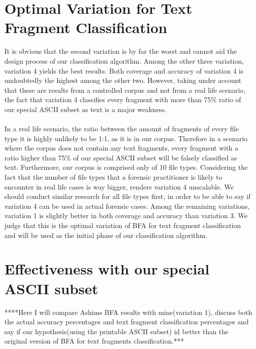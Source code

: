 \section{Optimal Variation for Text Fragment Classification}
It is obvious that the second variation is by far the worst and cannot aid the design process of our classification algorithm. Among the other three variation, variation 4 yields the best results. Both coverage and accuracy of variation 4 is undoubtedly the highest among the other two. However, taking under account that these are results from a controlled corpus and not from a real life scenario, the fact that variation 4 classifies every fragment with more than 75\% ratio of our special ASCII subset as text is a major weakness.\\\\
 In a real life scenario, the ratio between the amount of fragments of every file type it is highly unlikely to be 1:1, as it is in our corpus. Therefore in a scenario where the corpus does not contain any text fragments, every fragment with a ratio higher than 75\% of our special ASCII subset will be falsely classified as text. Furthermore, our corpus is comprised only of 10 file types. Considering the fact that the number of file types that a forensic practitioner is likely to encounter in real life cases is way bigger, renders variation 4 unscalable. We should conduct similar research for all file types first, in order to be able to say if variation 4 can be used in actual forensic cases. Among the remaining variations, variation 1 is slightly better in both coverage and accuracy than variation 3. We judge that this is the optimal variation of BFA for text fragment classification and will be used as the initial phase of our classification algorithm.


\section{Effectiveness with our special ASCII subset}

****Here I will compare Ashims BFA results with mine(variation 1), discuss both the actual accuracy percentages and text fragment classification percentages and say if our hypothesis(using the printable ASCII subset) id better than the original version of BFA for text fragments classification.***

